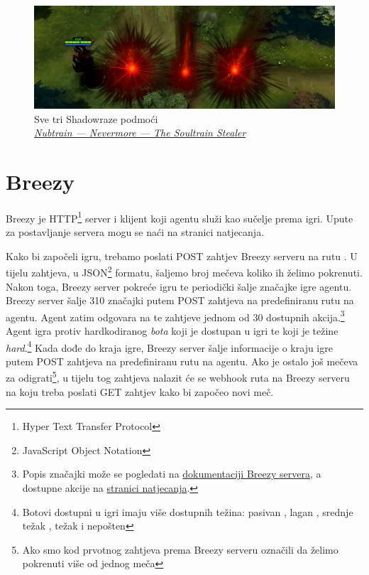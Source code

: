 \documentclass[times, utf8, zavrsni, numeric]{fer}
\begin{document}
\begin{figure}[h] 
    \centering
    \includegraphics[width=15cm]{img/shadowraze}
    \caption{Sve tri Shadowraze podmoći\\ \textsl{\scriptsize
    \href{https://steamcommunity.com/sharedfiles/filedetails/?id=113306813}{Nubtrain
    --- Nevermore --- The Soultrain Stealer}}}\label{fig:Shadowraze}
\end{figure}

\section{Breezy}

Breezy je HTTP\footnote{Hyper Text Transfer Protocol} server i klijent koji
agentu služi kao sučelje prema igri. Upute za postavljanje servera mogu se naći
na stranici natjecanja.\citep{project-breezy}

Kako bi započeli igru, trebamo poslati POST zahtjev Breezy serveru na rutu
. U tijelu zahtjeva, u JSON\footnote{JavaScript Object Notation}
formatu, šaljemo broj mečeva koliko ih želimo pokrenuti. Nakon toga, Breezy
server pokreće igru te periodički šalje značajke igre agentu. Breezy server
šalje 310 značajki putem POST zahtjeva na predefiniranu rutu na agentu. Agent
zatim odgovara na te zahtjeve jednom od 30 dostupnih akcija.\footnote{Popis
značajki može se pogledati na
\href{https://app.swaggerhub.com/apis-docs/aianta/breezy-server/0.0.1\#/default/get\_features\_}{dokumentaciji
Breezy servera}, a dostupne akcije na
\href{https://web.cs.dal.ca/~dota2/?page\_id=353}{stranici natjecanja}.} Agent
igra protiv hardkodiranog \emph{bota} koji je dostupan u igri te koji je težine
\emph{hard}.\footnote{Botovi dostupni u igri imaju više dostupnih težina:
pasivan , lagan , srednje težak , težak
 i nepošten } Kada dođe do kraja igre, Breezy server
šalje informacije o kraju igre putem POST zahtjeva na predefiniranu rutu na
agentu. Ako je ostalo još mečeva za odigrati\footnote{Ako smo kod prvotnog
zahtjeva prema Breezy serveru označili da želimo pokrenuti više od jednog meča},
u tijelu tog zahtjeva nalazit će se webhook ruta na Breezy serveru na koju treba
poslati GET zahtjev kako bi započeo novi meč.
\end{document}
